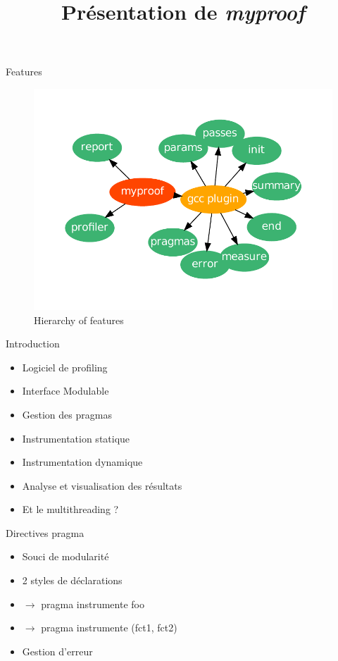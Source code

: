 \documentclass{beamer}
\title[Outil de profiling \emph{myproof}]{Présentation de \emph{myproof}}
\begin{document}
\begin{frame}
  \titlepage
\end{frame}

\begin{frame}{Features}
\begin{figure}[here]
  \centering
  \includegraphics[scale=0.7]{images/schema.pdf}
  \caption{Hierarchy of features}
\end{figure}
\end{frame}

\begin{frame}{Introduction}
  \begin{itemize}
  \item Logiciel de profiling
  \item Interface Modulable
  \item Gestion des pragmas
  \item Instrumentation statique
  \item Instrumentation dynamique
  \item Analyse et visualisation des résultats
  \item Et le multithreading ?
  \end{itemize}
\end{frame}

\begin{frame}{Directives pragma}
 \begin{itemize}
  \item Souci de modularité
  \item 2 styles de déclarations 
  \item $\rightarrow$ pragma instrumente foo
  \item $\rightarrow$ pragma instrumente (fct1, fct2)
  \item Gestion d'erreur
  \end{itemize}
 \end{frame}
\end{document}
